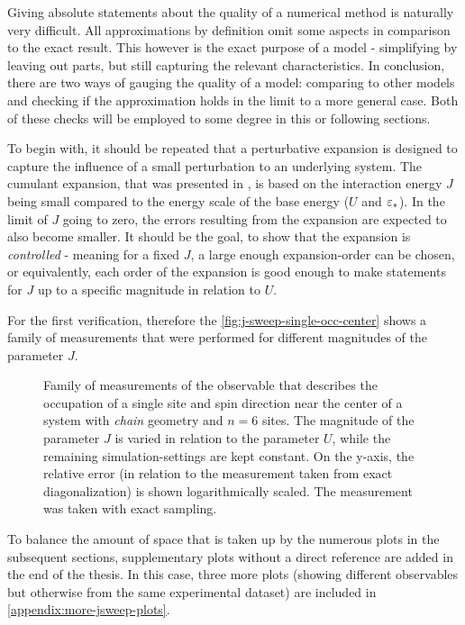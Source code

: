 Giving absolute statements about the quality of a numerical method is naturally very difficult.
All approximations by definition omit some aspects in comparison to the exact result.
This however is the exact purpose of a model - simplifying by leaving out parts, but still capturing the relevant characteristics.
In conclusion, there are two ways of gauging the quality of a model: comparing to other models and checking if the approximation holds in the limit to a more general case.
Both of these checks will be employed to some degree in this or following sections.

To begin with, it should be repeated that a perturbative expansion is designed to capture the influence of a \glqq small\grqq{} perturbation to an underlying system.
The cumulant expansion, that was presented in , is based on the interaction energy $J$ being small compared to the energy scale of the base energy ($U$ and $\epsl[\ast]$).
In the limit of $J$ going to zero, the errors resulting from the expansion are expected to also become smaller.
It should be the goal, to show that the expansion is \emph{controlled} - meaning for a fixed $J$, a large enough expansion-order can be chosen, or equivalently, each order of the expansion is good enough to make statements for $J$ up to a specific magnitude in relation to $U$. 

For the first verification, therefore the \autoref{fig:j-sweep-single-occ-center} shows a family of measurements that were performed for different magnitudes of the parameter $J$.

\begin{figure}[htbp]
    \centering
    \vspace{-0.7cm}
    \caption{
            Family of measurements of the observable that describes the occupation of a single site and spin direction near the center of a system with \emph{chain} geometry and $n=6$ sites.
            The magnitude of the parameter $J$ is varied in relation to the parameter $U$, while the remaining simulation-settings are kept constant.
            On the y-axis, the relative error (in relation to the measurement taken from exact diagonalization) is shown logarithmically scaled.
            The measurement was taken with exact sampling.
        }
    \label{fig:j-sweep-single-occ-center}
\end{figure}

To balance the amount of space that is taken up by the numerous plots in the subsequent sections, supplementary plots without a direct reference are added in the end of the thesis.
In this case, three more plots (showing different observables but otherwise from the same experimental dataset) are included in \ref{appendix:more-jsweep-plots}.

